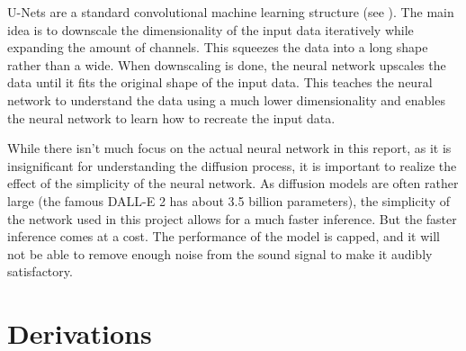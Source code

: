 \documentclass[a4paper, 12pt]{olplainarticle}
\begin{document}
U-Nets are a standard convolutional machine learning structure (see \cite{unet}). 
The main idea is to downscale the dimensionality of the input data iteratively while expanding the amount of channels.
This squeezes the data into a long shape rather than a wide. 
When downscaling is done, the neural network upscales the data until it fits the original shape of the input data.
This teaches the neural network to understand the data using a much lower dimensionality and enables the neural network to learn how to recreate the input data.

While there isn't much focus on the actual neural network in this report, as it is insignificant for understanding the diffusion process, it is important to realize the effect of the simplicity of the neural network.
As diffusion models are often rather large (the famous DALL-E 2 has about 3.5 billion parameters), the simplicity of the network used in this project allows for a much faster inference.
But the faster inference comes at a cost. The performance of the model is capped, and it will not be able to remove enough noise from the sound signal to make it audibly satisfactory.

\newpage


\newpage
\appendix
\section{Derivations}
\end{document}
